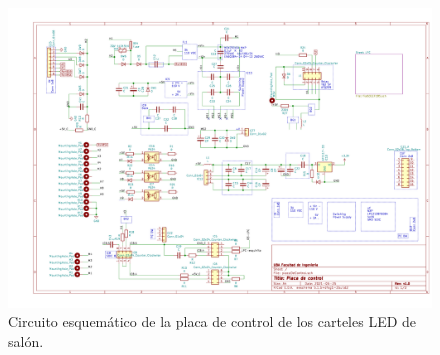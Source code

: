 \begin{figure}[ht]
	\centering
	\includegraphics[width=1\textwidth]{./Figures/output.placaControl.pdf}
	\caption{Circuito esquemático de la placa de control de los carteles LED de salón.}
	\label{fig:schController}
\end{figure}